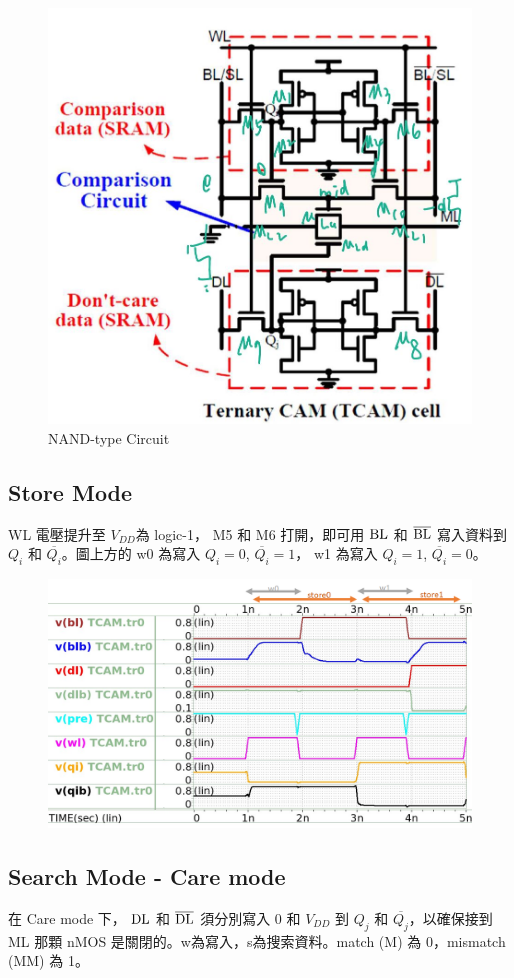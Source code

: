 \documentclass{article}
\begin{document}
\begin{figure}[H]
\centering
\includegraphics[width=0.5\linewidth]{./img/2023-12-14-00-36-19.png}
\caption{NAND-type Circuit}
\end{figure}


\subsection{Store Mode}

WL 電壓提升至 $V_{DD}$為 logic-1， M5 和 M6 打開，即可用 $\rm BL$ 和 $\rm \overline{BL}$ 寫入資料到 $Q_i$ 和 $\overline{Q_i}$。圖上方的 w0 為寫入 $Q_i = 0$, $\overline{Q_i} = 1$， w1 為寫入 $Q_i = 1$, $\overline{Q_i} = 0$。

\vspace*{-1em}

\begin{figure}[H]
\centering
\includegraphics[width=0.8\linewidth]{./img/2023-12-13-23-20-15.png}
\end{figure}

\subsection{Search Mode - Care mode}

在 Care mode 下， $\rm DL$ 和 $\rm \overline{DL}$ 須分別寫入 $0$ 和 $V_{DD}$ 到 $Q_j$ 和 $\overline{Q_j}$，以確保接到 ML 那顆 nMOS 是關閉的。w為寫入，s為搜索資料。match (M) 為 0，mismatch (MM) 為 1。
\end{document}
